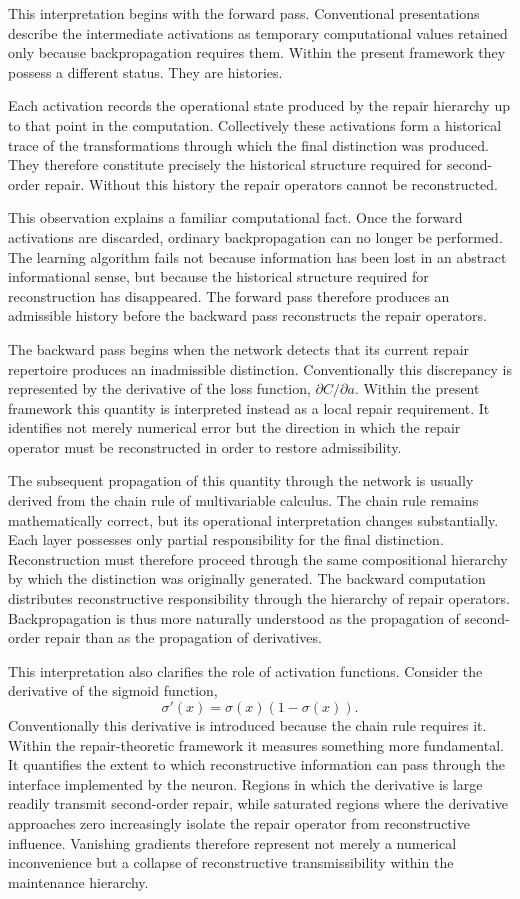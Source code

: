 \documentclass[12pt,oneside]{article}
\theoremstyle{plain}
\theoremstyle{definition}
\theoremstyle{remark}
\theoremstyle{plain}
\begin{document}
This interpretation begins with the forward pass. Conventional presentations describe the
intermediate activations as temporary computational values retained only because backpropagation
requires them. Within the present framework they possess a different status. They are histories.

Each activation records the operational state produced by the repair hierarchy up to that point in
the computation. Collectively these activations form a historical trace of the transformations
through which the final distinction was produced. They therefore constitute precisely the historical
structure required for second-order repair. Without this history the repair operators cannot be
reconstructed.

This observation explains a familiar computational fact. Once the forward activations are discarded,
ordinary backpropagation can no longer be performed. The learning algorithm fails not because
information has been lost in an abstract informational sense, but because the historical structure
required for reconstruction has disappeared. The forward pass therefore produces an admissible
history before the backward pass reconstructs the repair operators.

The backward pass begins when the network detects that its current repair repertoire produces an
inadmissible distinction. Conventionally this discrepancy is represented by the derivative of the
loss function, $\partial C / \partial a$. Within the present framework this quantity is interpreted
instead as a local repair requirement. It identifies not merely numerical error but the direction
in which the repair operator must be reconstructed in order to restore admissibility.

The subsequent propagation of this quantity through the network is usually derived from the chain
rule of multivariable calculus. The chain rule remains mathematically correct, but its operational
interpretation changes substantially. Each layer possesses only partial responsibility for the
final distinction. Reconstruction must therefore proceed through the same compositional hierarchy
by which the distinction was originally generated. The backward computation distributes
reconstructive responsibility through the hierarchy of repair operators. Backpropagation is thus
more naturally understood as the propagation of second-order repair than as the propagation of
derivatives.

This interpretation also clarifies the role of activation functions. Consider the derivative of
the sigmoid function,
\[
\sigma'(x) = \sigma(x)(1 - \sigma(x)).
\]
Conventionally this derivative is introduced because the chain rule requires it. Within the
repair-theoretic framework it measures something more fundamental. It quantifies the extent to
which reconstructive information can pass through the interface implemented by the neuron. Regions
in which the derivative is large readily transmit second-order repair, while saturated regions
where the derivative approaches zero increasingly isolate the repair operator from reconstructive
influence. Vanishing gradients therefore represent not merely a numerical inconvenience but a
collapse of reconstructive transmissibility within the maintenance hierarchy.
\end{document}
